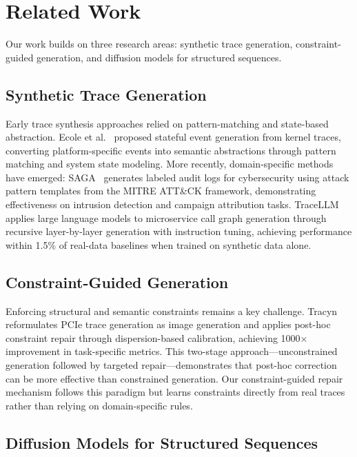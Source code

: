 \section{Related Work}
\label{sec:related-works}

Our work builds on three research areas: synthetic trace generation, constraint-guided generation, and diffusion models for structured sequences.

\subsection{Synthetic Trace Generation}

Early trace synthesis approaches relied on pattern-matching and state-based abstraction. Ecole et al.~\cite{Ecole4861} proposed stateful event generation from kernel traces, converting platform-specific events into semantic abstractions through pattern matching and system state modeling. More recently, domain-specific methods have emerged: SAGA~\cite{Huang2024SAGASA} generates labeled audit logs for cybersecurity using attack pattern templates from the MITRE ATT\&CK framework, demonstrating effectiveness on intrusion detection and campaign attribution tasks. TraceLLM~\cite{kim2025largelanguagemodelsrealistic} applies large language models to microservice call graph generation through recursive layer-by-layer generation with instruction tuning, achieving performance within 1.5\% of real-data baselines when trained on synthetic data alone.

\subsection{Constraint-Guided Generation}

Enforcing structural and semantic constraints remains a key challenge. Tracyn~\cite{huang2025projecttracyngenerativeartificial} reformulates PCIe trace generation as image generation and applies post-hoc constraint repair through dispersion-based calibration, achieving 1000× improvement in task-specific metrics. This two-stage approach—unconstrained generation followed by targeted repair—demonstrates that post-hoc correction can be more effective than constrained generation. Our constraint-guided repair mechanism follows this paradigm but learns constraints directly from real traces rather than relying on domain-specific rules.

\subsection{Diffusion Models for Structured Sequences}


